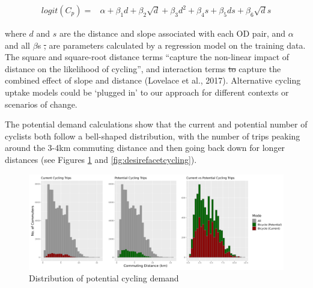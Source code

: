 \documentclass[
]{article}
\providecommand{\DIFdeltex}[1]{{\protect\color{red}\sout{#1}}}                      %
\providecommand{\DIFdelbegin}{} %
\providecommand{\DIFdelend}{} %
\providecommand{\DIFaddbeginFL}{} %
\providecommand{\DIFaddendFL}{} %
\providecommand{\DIFdelbeginFL}{} %
\providecommand{\DIFdelendFL}{} %
\providecommand{\DIFdel}[1]{\texorpdfstring{\DIFdeltex{#1}}{}} %
\newcommand{\DIFscaledelfig}{0.5}
\newlength{\DIFdelgraphicswidth} %
\newlength{\DIFdelgraphicsheight} %
\newcommand{\DIFaddincludegraphics}[2][]{{\color{blue}\fbox{\DIFOincludegraphics[#1]{#2}}}} %
\newcommand{\DIFdelincludegraphics}[2][]{%
\sbox{\DIFdelgraphicsbox}{\DIFOincludegraphics[#1]{#2}}%
\settoboxwidth{\DIFdelgraphicswidth}{\DIFdelgraphicsbox} %
\settoboxtotalheight{\DIFdelgraphicsheight}{\DIFdelgraphicsbox} %
\scalebox{\DIFscaledelfig}{%
\parbox[b]{\DIFdelgraphicswidth}{\usebox{\DIFdelgraphicsbox}\\[-\baselineskip] \rule{\DIFdelgraphicswidth}{0em}}\llap{\resizebox{\DIFdelgraphicswidth}{\DIFdelgraphicsheight}{%
\setlength{\unitlength}{\DIFdelgraphicswidth}%
\begin{picture}(1,1)%
\thicklines\linethickness{2pt} %
{\color[rgb]{1,0,0}\put(0,0){\framebox(1,1){}}}%
{\color[rgb]{1,0,0}\put(0,0){\line( 1,1){1}}}%
{\color[rgb]{1,0,0}\put(0,1){\line(1,-1){1}}}%
\end{picture}%
}\hspace*{3pt}}} %
} %
\DeclareRobustCommand{\DIFdelbegin}{\DIFOdelbegin \let\includegraphics\DIFdelincludegraphics} %
\DeclareRobustCommand{\DIFdelend}{\DIFOaddend \let\includegraphics\DIFOincludegraphics} %
\DeclareRobustCommand{\DIFaddbeginFL}{\DIFOaddbeginFL \let\includegraphics\DIFaddincludegraphics} %
\DeclareRobustCommand{\DIFaddendFL}{\DIFOaddendFL \let\includegraphics\DIFOincludegraphics} %
\DeclareRobustCommand{\DIFdelbeginFL}{\DIFOdelbeginFL \let\includegraphics\DIFdelincludegraphics} %
\DeclareRobustCommand{\DIFdelendFL}{\DIFOaddendFL \let\includegraphics\DIFOincludegraphics} %
\begin{document}
\begin{align}\label{eq:pcteqn}
     logit(C_{p}) = & \alpha + \beta_1 d + \beta_2 \sqrt{d} + \beta_3 d^2 + \beta_4 s + \beta_5 ds + \beta_6 \sqrt{d}s 
\end{align}

\noindent where \(d\) and \(s\) are the distance and slope associated with each
OD pair, and \(\alpha\) and all \(\beta\)s \DIFdelbegin \DIFdel{, }\DIFdelend are parameters calculated by a regression
model on the training data. The square and square-root distance terms
``capture the non-linear impact of distance on the likelihood of
cycling'', and interaction terms \DIFdelbegin \DIFdel{to }\DIFdelend capture the combined effect of slope
and distance (Lovelace et al., 2017). Alternative cycling uptake
models could be `plugged in' to our approach for different contexts or scenarios of change.

The potential demand calculations show that the current and potential
number of cyclists both follow a bell-shaped distribution, with the
number of trips peaking around the 3-4km commuting distance and then
going back down for longer distances (see Figures
\ref{fig:potdemhistograms} and \ref{fig:desirefacetcycling}).

\begin{figure}

{\centering \DIFdelbeginFL %
\DIFdelendFL \DIFaddbeginFL \includegraphics[width=0.9\linewidth]{data/Manchester/Plots/histogram_distance_cycling_potential_current_all} 
\DIFaddendFL 

}

\caption{Distribution of potential cycling demand}\label{fig:potdemhistograms}
\end{figure}
\end{document}
